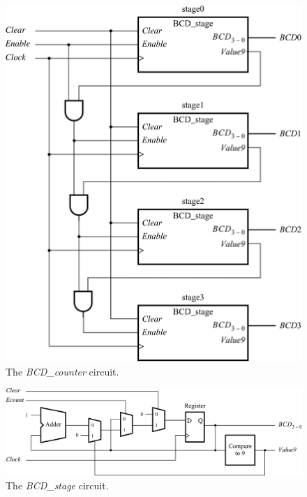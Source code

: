 \documentclass[11pt, twoside, pdftex]{article}
\begin{document}
\begin{figure}[H]
   \begin{center}
      \includegraphics[scale=1]{figures/figure10.png}
   \caption{The {\it BCD\_counter} circuit.} 
	 \label{fig:10}
	 \end{center}
\end{figure}

\begin{figure}[H]
   \begin{center}
      \includegraphics[scale=1]{figures/figure11.png}
   \caption{The {\it BCD\_stage} circuit.} 
	 \label{fig:11}
	 \end{center}
\end{figure}
\end{document}
